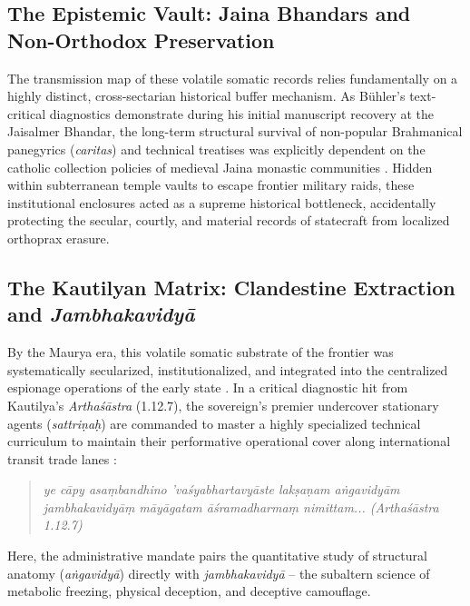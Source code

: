 \documentclass[11pt,twoside,letterpaper]{article}
\begin{document}
\subsection{The Epistemic Vault: Jaina Bhandars and Non-Orthodox Preservation}
The transmission map of these volatile somatic records relies fundamentally on a highly distinct, cross-sectarian historical buffer mechanism. As Bühler’s text-critical diagnostics demonstrate during his initial manuscript recovery at the Jaisalmer Bhandar, the long-term structural survival of non-popular Brahmanical panegyrics (\textit{caritas}) and technical treatises was explicitly dependent on the catholic collection policies of medieval Jaina monastic communities \cite{Buhler1875}. Hidden within subterranean temple vaults to escape frontier military raids, these institutional enclosures acted as a supreme historical bottleneck, accidentally protecting the secular, courtly, and material records of statecraft from localized orthoprax erasure.


\subsection{The Kautilyan Matrix: Clandestine Extraction and \textit{Jambhakavidyā}}

By the Maurya era, this volatile somatic substrate of the frontier was systematically secularized, institutionalized, and integrated into the centralized espionage operations of the early state \cite{ArthaŚ}. In a critical diagnostic hit from Kautilya’s \textit{Arthaśāstra} (1.12.7), the sovereign’s premier undercover stationary agents (\textit{sattriṇaḥ}) are commanded to master a highly specialized technical curriculum to maintain their performative operational cover along international transit trade lanes \cite{ArthaŚ}:
\begin{quote}
    \textit{ye cāpy asaṃbandhino ’vaśyabhartavyāste lakṣaṇam aṅgavidyām} \\
    \textit{jambhakavidyāṃ māyāgatam āśramadharmaṃ nimittam... (Arthaśāstra 1.12.7)}
\end{quote}
Here, the administrative mandate pairs the quantitative study of structural anatomy (\textit{aṅgavidyā}) directly with \textit{jambhakavidyā} -- the subaltern science of metabolic freezing, physical deception, and deceptive camouflage. 
\end{document}
